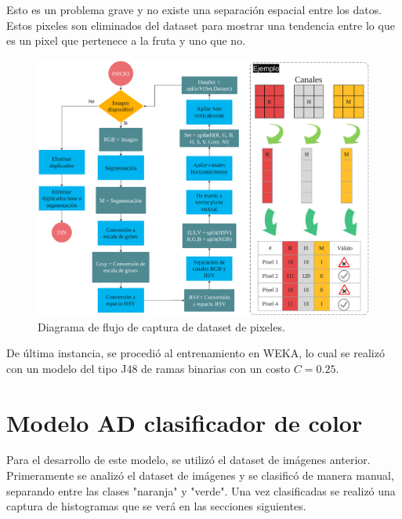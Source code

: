 \documentclass[twoside,spanish,ESP,MSc]{plantillaLabUPV}
\theoremstyle{definition}
\begin{document}

Esto es un problema grave y no existe una separación espacial entre los datos. Estos pixeles son eliminados del dataset para mostrar una tendencia entre lo que es un pixel que pertenece a la fruta y uno que no.

\begin{figure}
	\centering
	\includegraphics[width=0.9\linewidth]{edrawimas/dspixes}
	\caption{Diagrama de flujo de captura de dataset de pixeles.}
	\label{fig:dspixes}
\end{figure}

De última instancia, se procedió al entrenamiento en WEKA, lo cual se realizó con un modelo del tipo J48 de ramas binarias con un costo $C=0.25$.


\section{Modelo AD clasificador de color} \label{sec:classcol}

Para el desarrollo de este modelo, se utilizó el dataset de imágenes anterior. Primeramente se analizó el dataset de imágenes y se clasificó de manera manual, separando entre las clases "naranja" y "verde". Una vez clasificadas se realizó una captura de histogramas que se verá en las secciones siguientes.
\end{document}
